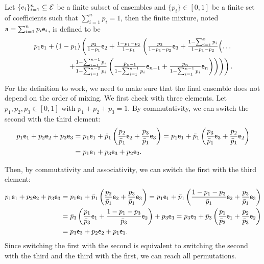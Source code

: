 \begin{mathSection}
\begin{defn}
	Let $\{e_i\}_{i=1}^{n} \subseteq \Ens$ be a finite subset of ensembles and $\{p_i\} \in [0,1]$ be a finite set of coefficients such that $\sum_{i=1}^{n} p_i = 1$, then the finite mixture, noted $\ens[a] = \sum_{i=1}^{n} p_i \ens_i$, is defined to be
	\begin{equation}
		\begin{split}
	p_1 \ens_1 + (1-p_1)\left( \tfrac{p_2}{1-p_1} \ens_2 + \tfrac{1-p_1-p_2}{1-p_1} \left( \tfrac{p_3}{1-p_1-p_2} \ens_3 +  \tfrac{1-\sum_{i=1}^{3}p_i}{1-p_1-p_2}\Bigl(\ldots \right.\right. \\
\left.\left.\left.+\tfrac{1-\sum_{i=1}^{n-1}p_i}{1-\sum_{i=1}^{n-2}p_i}\left(\tfrac{p_{n-1}}{1- \sum_{i=1}^{n-1}p_i} \ens_{n-1} + \tfrac{p_n}{1- \sum_{i=1}^{n-1}p_i}\ens_n\right)\right) \right) \right).
		\end{split}
	\end{equation}
\end{defn}

\begin{check}
	For the definition to work, we need to make sure that the final ensemble does not depend on the order of mixing. We first check with three elements. Let $p_1, p_2, p_3 \in [0,1]$ with $p_1+p_2+p_3=1$. By commutativity, we can switch the second with the third element:
	\begin{equation}
	\begin{aligned}
		p_1 \ens[e]_1 + p_2 \ens[e]_2 + p_3 \ens_3 &= p_1 \ens_1 + \bar{p}_1\left(\frac{p_2}{\bar{p}_1}\ens_2 + \frac{p_3}{\bar{p}_1}\ens_3\right) = p_1 \ens_1 + \bar{p}_1\left(\frac{p_3}{\bar{p}_1} \ens_3 +  \frac{p_2}{\bar{p}_1}\ens_2\right) \\
		&= p_1 \ens[e]_1 + p_3 \ens[e]_3 + p_2 \ens_2.
	\end{aligned}
	\end{equation}
	
	Then, by commutativity and associativity, we can switch the first with the third element:
	\begin{equation}
		\begin{aligned}
	 p_1 \ens[e]_1 + p_2 \ens[e]_2 + p_3 \ens_3 &= p_1 \ens_1 + \bar{p}_1\left(\frac{p_2}{\bar{p}_1}\ens_2 + \frac{p_3}{\bar{p}_1}\ens_3\right) = p_1 \ens_1 + \bar{p}_1\left(\frac{1-p_1-p_3}{\bar{p}_1}\ens_2 + \frac{p_3}{\bar{p}_1}\ens_3\right) \\
	 &= \bar{p}_3\left(\frac{p_1}{\bar{p}_3} \ens_1 + \frac{1-p_1-p_3}{\bar{p}_3}\ens_2\right) + p_3 \ens_3 = p_3 \ens_3 + \bar{p}_3\left(\frac{p_1}{\bar{p}_3} \ens_1 + \frac{p_2}{\bar{p}_3}\ens_2\right) \\
	 &= p_3 \ens[e]_3 + p_2 \ens[e]_2 + p_1 \ens_1.
		\end{aligned}
	\end{equation}
	Since switching the first with the second is equivalent to switching the second with the third and the third with the first, we can reach all permutations.
	

\end{check}
\end{mathSection}
